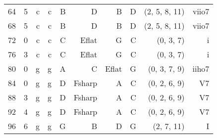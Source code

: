 \begin{tabular}{r|rrrrrrrrr}
64       & 5   & c    & c    & B            & D            & B           & D            & (2, 5, 8, 11) & viio7 \\
68       & 5   & c    & c    & B            & D            & B           & D            & (2, 5, 8, 11) & viio7 \\ \hline
72       & 0   & c    & c    & C            & E\gls{flat}  & G           & C            & (0, 3, 7)     & i     \\
76       & 3   & c    & c    & C            & E\gls{flat}  & G           & C            & (0, 3, 7)     & i     \\
80       & 0   & g    & g    & A            & C            & E\gls{flat} & G            & (0, 3, 7, 9)  & iiho7 \\
84       & 0   & g    & g    & D            & F\gls{sharp} & A           & C            & (0, 2, 6, 9)  & V7    \\
88       & 3   & g    & g    & D            & F\gls{sharp} & A           & C            & (0, 2, 6, 9)  & V7    \\
92       & 4   & g    & g    & D            & F\gls{sharp} & A           & C            & (0, 2, 6, 9)  & V7    \\ \hline
96       & 6   & g    & g    & G            & B            & D           & G            & (2, 7, 11)    & I     \\
\end{tabular}
